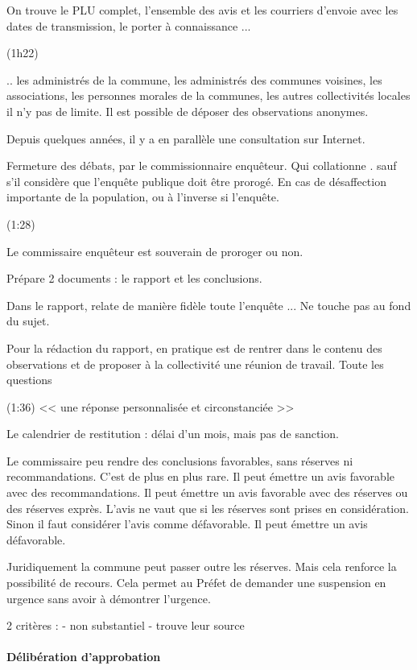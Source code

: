 		On trouve le PLU complet, l'ensemble des avis et les courriers d'envoie avec les dates de transmission, le porter à connaissance ...

		(1h22)

		.. les administrés de la commune, les administrés des communes voisines, les associations, les personnes morales de la communes, les autres collectivités locales \etc il n'y pas de limite. Il est possible de déposer des observations anonymes.

		Depuis quelques années, il y a en parallèle une consultation sur Internet.

		Fermeture des débats, par le commissionnaire enquêteur. Qui collationne . sauf s'il considère que l'enquête publique doit être prorogé. En cas de désaffection importante de la population, ou à l'inverse si l'enquête.

		(1:28)

		Le commissaire enquêteur est souverain de proroger ou non.

		Prépare 2 documents : le rapport et les conclusions.

		Dans le rapport, relate de manière fidèle toute l'enquête ... \etc Ne touche pas au fond du sujet.

		Pour la rédaction du rapport, en pratique est de rentrer dans le contenu des observations et de proposer à la collectivité une réunion de travail. Toute les questions

		(1:36) << une réponse personnalisée et circonstanciée >>


		Le calendrier de restitution : délai d'un mois, mais pas de sanction.

		Le commissaire peu rendre des conclusions favorables, sans réserves ni recommandations. C'est de plus en plus rare.
		Il peut émettre un avis favorable avec des recommandations.
		Il peut émettre un avis favorable avec des réserves ou des réserves exprès. L'avis ne vaut que si les réserves sont prises en considération. Sinon il faut considérer l'avis comme défavorable.
		Il peut émettre un avis défavorable.

		Juridiquement la commune peut passer outre les réserves. Mais cela renforce la possibilité de recours. Cela permet au Préfet de demander une suspension en urgence sans avoir à démontrer l'urgence.

		2 critères :
			- non substantiel
			- trouve leur source

		\paragraph{Délibération d'approbation}

